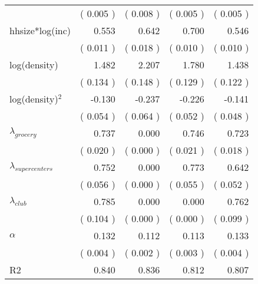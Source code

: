 \begin{table}[htbp]
\begin{tabular}{l*{ 4 }{D{.}{.}{-1}}}
& (  0.005 )&(  0.008 )&(  0.005 )&(  0.005 )\\ 
hhsize*log(inc) & 0.553 & 0.642 & 0.700 & 0.546 \\ 
& (  0.011 )&(  0.018 )&(  0.010 )&(  0.010 )\\ 
log(density) & 1.482 & 2.207 & 1.780 & 1.438 \\ 
& (  0.134 )&(  0.148 )&(  0.129 )&(  0.122 )\\ 
log(density)$^2$ &-0.130 &-0.237 &-0.226 &-0.141 \\ 
& (  0.054 )&(  0.064 )&(  0.052 )&(  0.048 )\\ 
$\lambda_{grocery}$ & 0.737 & 0.000 & 0.746 & 0.723 \\ 
& (  0.020 )&(  0.000 )&(  0.021 )&(  0.018 )\\ 
$\lambda_{supercenters}$ & 0.752 & 0.000 & 0.773 & 0.642 \\ 
& (  0.056 )&(  0.000 )&(  0.055 )&(  0.052 )\\ 
$\lambda_{club}$ & 0.785 & 0.000 & 0.000 & 0.762 \\ 
& (  0.104 )&(  0.000 )&(  0.000 )&(  0.099 )\\ 
$\alpha$ & 0.132 & 0.112 & 0.113 & 0.133 \\ 
& (  0.004 )&(  0.002 )&(  0.003 )&(  0.004 )\\ 
\midrule 
R2 &  0.840&  0.836&  0.812&  0.807\\ 
\bottomrule\end{tabular}\end{table}